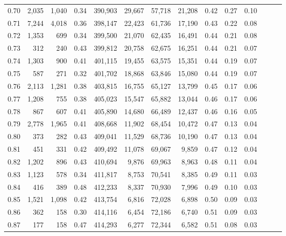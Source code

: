 \begin{tabular}{rrrrrrrrrrrrrr}
0.70 &   2,035 &  1,040 &  0.34 &  390,903 &   29,667 &  57,718 &  21,208 &  0.42 &  0.27 &      0.10 \\
0.71 &   7,244 &  4,018 &  0.36 &  398,147 &   22,423 &  61,736 &  17,190 &  0.43 &  0.22 &      0.08 \\
0.72 &   1,353 &    699 &  0.34 &  399,500 &   21,070 &  62,435 &  16,491 &  0.44 &  0.21 &      0.08 \\
0.73 &     312 &    240 &  0.43 &  399,812 &   20,758 &  62,675 &  16,251 &  0.44 &  0.21 &      0.07 \\
0.74 &   1,303 &    900 &  0.41 &  401,115 &   19,455 &  63,575 &  15,351 &  0.44 &  0.19 &      0.07 \\
0.75 &     587 &    271 &  0.32 &  401,702 &   18,868 &  63,846 &  15,080 &  0.44 &  0.19 &      0.07 \\
0.76 &   2,113 &  1,281 &  0.38 &  403,815 &   16,755 &  65,127 &  13,799 &  0.45 &  0.17 &      0.06 \\
0.77 &   1,208 &    755 &  0.38 &  405,023 &   15,547 &  65,882 &  13,044 &  0.46 &  0.17 &      0.06 \\
0.78 &     867 &    607 &  0.41 &  405,890 &   14,680 &  66,489 &  12,437 &  0.46 &  0.16 &      0.05 \\
0.79 &   2,778 &  1,965 &  0.41 &  408,668 &   11,902 &  68,454 &  10,472 &  0.47 &  0.13 &      0.04 \\
0.80 &     373 &    282 &  0.43 &  409,041 &   11,529 &  68,736 &  10,190 &  0.47 &  0.13 &      0.04 \\
0.81 &     451 &    331 &  0.42 &  409,492 &   11,078 &  69,067 &   9,859 &  0.47 &  0.12 &      0.04 \\
0.82 &   1,202 &    896 &  0.43 &  410,694 &    9,876 &  69,963 &   8,963 &  0.48 &  0.11 &      0.04 \\
0.83 &   1,123 &    578 &  0.34 &  411,817 &    8,753 &  70,541 &   8,385 &  0.49 &  0.11 &      0.03 \\
0.84 &     416 &    389 &  0.48 &  412,233 &    8,337 &  70,930 &   7,996 &  0.49 &  0.10 &      0.03 \\
0.85 &   1,521 &  1,098 &  0.42 &  413,754 &    6,816 &  72,028 &   6,898 &  0.50 &  0.09 &      0.03 \\
0.86 &     362 &    158 &  0.30 &  414,116 &    6,454 &  72,186 &   6,740 &  0.51 &  0.09 &      0.03 \\
0.87 &     177 &    158 &  0.47 &  414,293 &    6,277 &  72,344 &   6,582 &  0.51 &  0.08 &      0.03 \\

\end{tabular}
